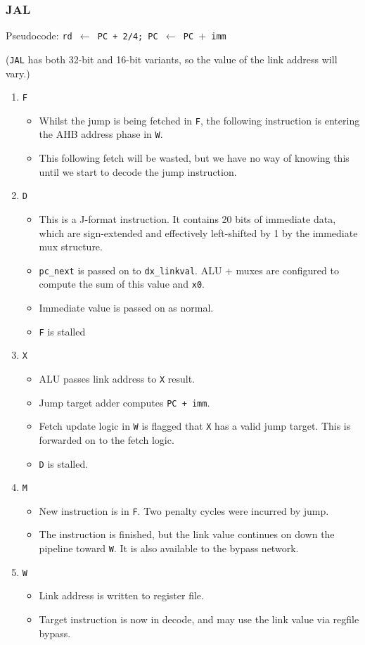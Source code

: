\documentclass{article}
\begin{document}
\subsubsection{JAL}

Pseudocode: \texttt{rd $\leftarrow$ PC + 2/4;  PC $\leftarrow$ PC $+$ imm}

(\texttt{JAL} has both 32-bit and 16-bit variants, so the value of the link address will vary.)


\begin{enumerate}
	\item \texttt{F}
	\begin{itemize}
		\item Whilst the jump is being fetched in \texttt{F}, the following instruction is entering the AHB address phase in \texttt{W}.
		\item This following fetch will be wasted, but we have no way of knowing this until we start to decode the jump instruction.
	\end{itemize}
	\item \texttt{D}
	\begin{itemize}
		\item This is a J-format instruction. It contains 20 bits of immediate data, which are sign-extended and effectively left-shifted by 1 by the immediate mux structure.
		\item \texttt{pc\_next} is passed on to \texttt{dx\_linkval}. ALU + muxes are configured to compute the sum of this value and \texttt{x0}.
		\item Immediate value is passed on as normal.
		\item \texttt{F} is stalled
	\end{itemize}
	\item \texttt{X}
	\begin{itemize}
		\item ALU passes link address to \texttt{X} result.
		\item Jump target adder computes \texttt{PC + imm}.
		\item Fetch update logic in \texttt{W} is flagged that \texttt{X} has a valid jump target. This is forwarded on to the fetch logic.
		\item \texttt{D} is stalled.
	\end{itemize}
	\item \texttt{M}
	\begin{itemize}
		\item New instruction is in \texttt{F}. Two penalty cycles were incurred by jump.
		\item The instruction is finished, but the link value continues on down the pipeline toward \texttt{W}. It is also available to the bypass network.
	\end{itemize}
	\item \texttt{W}
	\begin{itemize}
		\item Link address is written to register file.
		\item Target instruction is now in decode, and may use the link value via regfile bypass.
	\end{itemize}
\end{enumerate}
\end{document}

